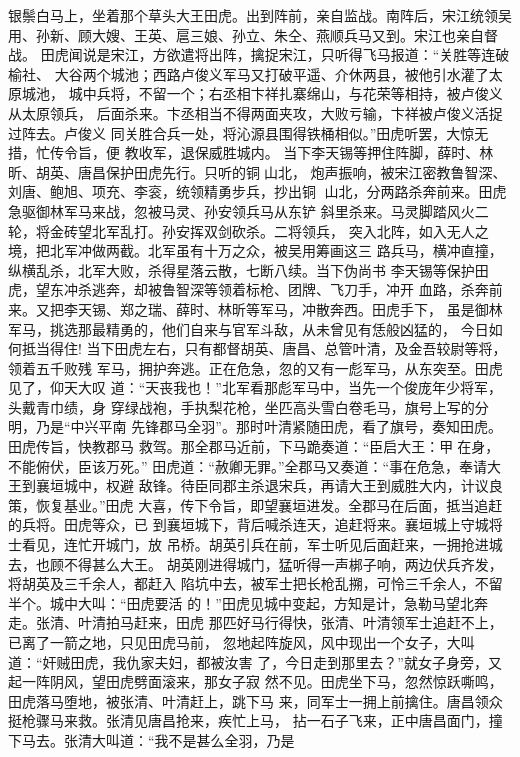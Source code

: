 银鬃白马上，坐着那个草头大王田虎。出到阵前，亲自监战。南阵后，宋江统领吴
用、孙新、顾大嫂、王英、扈三娘、孙立、朱仝、燕顺兵马又到。宋江也亲自督战。
田虎闻说是宋江，方欲遣将出阵，擒捉宋江，只听得飞马报道：“关胜等连破榆社、
大谷两个城池；西路卢俊义军马又打破平遥、介休两县，被他引水灌了太原城池，
城中兵将，不留一个；右丞相卞祥扎寨绵山，与花荣等相持，被卢俊义从太原领兵，
后面杀来。卞丞相当不得两面夹攻，大败亏输，卞祥被卢俊义活捉过阵去。卢俊义
同关胜合兵一处，将沁源县围得铁桶相似。”田虎听罢，大惊无措，忙传令旨，便
教收军，退保威胜城内。
当下李天锡等押住阵脚，薛时、林昕、胡英、唐昌保护田虎先行。只听的铜山北，
炮声振响，被宋江密教鲁智深、刘唐、鲍旭、项充、李衮，统领精勇步兵，抄出铜
山北，分两路杀奔前来。田虎急驱御林军马来战，忽被马灵、孙安领兵马从东铲
斜里杀来。马灵脚踏风火二轮，将金砖望北军乱打。孙安挥双剑砍杀。二将领兵，
突入北阵，如入无人之境，把北军冲做两截。北军虽有十万之众，被吴用筹画这三
路兵马，横冲直撞，纵横乱杀，北军大败，杀得星落云散，七断八续。当下伪尚书
李天锡等保护田虎，望东冲杀逃奔，却被鲁智深等领着标枪、团牌、飞刀手，冲开
血路，杀奔前来。又把李天锡、郑之瑞、薛时、林昕等军马，冲散奔西。田虎手下，
虽是御林军马，挑选那最精勇的，他们自来与官军斗敌，从未曾见有恁般凶猛的，
今日如何抵当得住!
当下田虎左右，只有都督胡英、唐昌、总管叶清，及金吾较尉等将，领着五千败残
军马，拥护奔逃。正在危急，忽的又有一彪军马，从东突至。田虎见了，仰天大叹
道：“天丧我也！”北军看那彪军马中，当先一个俊庞年少将军，头戴青巾绩，身
穿绿战袍，手执梨花枪，坐匹高头雪白卷毛马，旗号上写的分明，乃是“中兴平南
先锋郡马全羽”。那时叶清紧随田虎，看了旗号，奏知田虎。田虎传旨，快教郡马
救驾。那全郡马近前，下马跪奏道：“臣启大王：甲在身，不能俯伏，臣该万死。”
田虎道：“赦卿无罪。”全郡马又奏道：“事在危急，奉请大王到襄垣城中，权避
敌锋。待臣同郡主杀退宋兵，再请大王到威胜大内，计议良策，恢复基业。”田虎
大喜，传下令旨，即望襄垣进发。全郡马在后面，抵当追赶的兵将。田虎等众，已
到襄垣城下，背后喊杀连天，追赶将来。襄垣城上守城将士看见，连忙开城门，放
吊桥。胡英引兵在前，军士听见后面赶来，一拥抢进城去，也顾不得甚么大王。
胡英刚进得城门，猛听得一声梆子响，两边伏兵齐发，将胡英及三千余人，都赶入
陷坑中去，被军士把长枪乱搠，可怜三千余人，不留半个。城中大叫：“田虎要活
的！”田虎见城中变起，方知是计，急勒马望北奔走。张清、叶清拍马赶来，田虎
那匹好马行得快，张清、叶清领军士追赶不上，已离了一箭之地，只见田虎马前，
忽地起阵旋风，风中现出一个女子，大叫道：“奸贼田虎，我仇家夫妇，都被汝害
了，今日走到那里去？”就女子身旁，又起一阵阴风，望田虎劈面滚来，那女子寂
然不见。田虎坐下马，忽然惊跃嘶鸣，田虎落马堕地，被张清、叶清赶上，跳下马
来，同军士一拥上前擒住。唐昌领众挺枪骤马来救。张清见唐昌抢来，疾忙上马，
拈一石子飞来，正中唐昌面门，撞下马去。张清大叫道：“我不是甚么全羽，乃是
